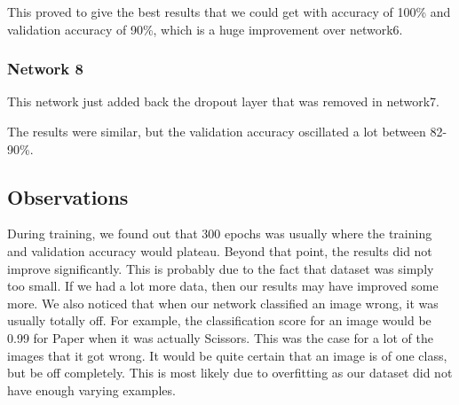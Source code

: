 
This proved to give the best results that we could get with accuracy of 100\% and validation accuracy of 90\%, which is a huge improvement over network6.
\subsubsection{Network 8}

This network just added back the dropout layer that was removed in network7.


The results were similar, but the validation accuracy oscillated a lot between 82-90\%.
\subsection{Observations}
During training, we found out that 300 epochs was usually where the training and validation accuracy would plateau. Beyond that point, the results did not improve significantly. This is probably due to the fact that dataset was simply too small. If we had a lot more data, then our results may have improved some more.
We also noticed that when our network classified an image wrong, it was usually totally off. For example, the classification score for an image would be 0.99 for Paper when it was actually Scissors. This was the case for a lot of the images that it got wrong. It would be quite certain that an image is of one class, but be off completely. This is most likely due to overfitting as our dataset did not have enough varying examples.
